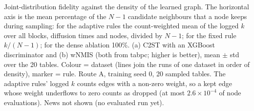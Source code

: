 Joint-distribution fidelity against the density of the learned graph. The horizontal axis is the mean percentage of the $N-1$ candidate neighbours that a node keeps during sampling: for the adaptive rules the count-weighted mean of the logged $k$ over all blocks, diffusion times and nodes, divided by $N-1$; for the fixed rule $k/(N-1)$; for the dense ablation 100\%. (a) C2ST with an XGBoost discriminator and (b) wNMIS (both from tabpc; higher is better), mean $\pm$ std over the 20 tables. Colour = dataset (lines join the runs of one dataset in order of density), marker = rule. Route A, training seed 0, 20 sampled tables. The adaptive rules' logged $k$ counts edges with a non-zero weight, so a kept edge whose weight underflows to zero counts as dropped (at most $2.6\times 10^{-4}$ of node evaluations). News not shown (no evaluated run yet).
